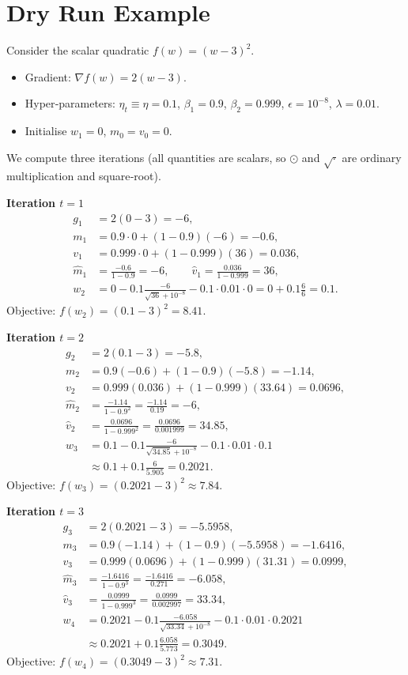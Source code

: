 \documentclass{article}
\begin{document}
\section*{Dry Run Example}
Consider the scalar quadratic $f(w)=(w-3)^2$.
\begin{itemize}
\item Gradient: $\nabla f(w)=2(w-3)$.
\item Hyper‑parameters: $\eta_t\equiv \eta=0.1$, $\beta_1=0.9$, $\beta_2=0.999$, $\epsilon=10^{-8}$, $\lambda=0.01$.
\item Initialise $w_1=0$, $m_0=v_0=0$.
\end{itemize}
We compute three iterations (all quantities are scalars, so $\odot$ and $\sqrt{\cdot}$ are ordinary multiplication and square‑root).

\medskip
\noindent\textbf{Iteration $t=1$}
\begin{align*}
    g_1 &= 2(0-3) = -6,\\
    m_1 &=0.9\cdot0+(1-0.9)(-6)= -0.6,\\
    v_1 &=0.999\cdot0+(1-0.999)(36)=0.036,\\
    \hat m_1 &=\frac{-0.6}{1-0.9}= -6,\qquad
    \hat v_1 =\frac{0.036}{1-0.999}=36,\\
    w_{2} &= 0 -0.1\frac{-6}{\sqrt{36}+10^{-8}} -0.1\cdot0.01\cdot0
           =0+0.1\frac{6}{6}=0.1 .
\end{align*}
Objective: $f(w_2)=(0.1-3)^2=8.41$.

\medskip
\noindent\textbf{Iteration $t=2$}
\begin{align*}
    g_2 &= 2(0.1-3) = -5.8,\\
    m_2 &=0.9(-0.6)+(1-0.9)(-5.8)= -1.14,\\
    v_2 &=0.999(0.036)+(1-0.999)(33.64)=0.0696,\\
    \hat m_2 &=\frac{-1.14}{1-0.9^{2}} =\frac{-1.14}{0.19}= -6,\\
    \hat v_2 &=\frac{0.0696}{1-0.999^{2}} =\frac{0.0696}{0.001999}=34.85,\\
    w_{3} &= 0.1 -0.1\frac{-6}{\sqrt{34.85}+10^{-8}} -0.1\cdot0.01\cdot0.1\\
          &\approx 0.1+0.1\frac{6}{5.905}=0.2021 .
\end{align*}
Objective: $f(w_3)=(0.2021-3)^2\approx7.84$.

\medskip
\noindent\textbf{Iteration $t=3$}
\begin{align*}
    g_3 &= 2(0.2021-3) = -5.5958,\\
    m_3 &=0.9(-1.14)+(1-0.9)(-5.5958)= -1.6416,\\
    v_3 &=0.999(0.0696)+(1-0.999)(31.31)=0.0999,\\
    \hat m_3 &=\frac{-1.6416}{1-0.9^{3}} =\frac{-1.6416}{0.271}= -6.058,\\
    \hat v_3 &=\frac{0.0999}{1-0.999^{3}} =\frac{0.0999}{0.002997}=33.34,\\
    w_{4} &= 0.2021 -0.1\frac{-6.058}{\sqrt{33.34}+10^{-8}} -0.1\cdot0.01\cdot0.2021\\
          &\approx 0.2021+0.1\frac{6.058}{5.773}=0.3049 .
\end{align*}
Objective: $f(w_4)=(0.3049-3)^2\approx7.31$.
\end{document}
